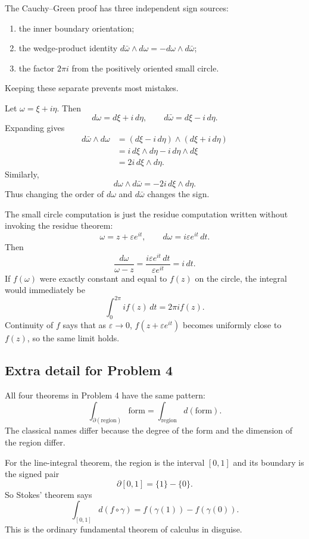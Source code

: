 \documentclass[11pt]{article}
\newcommand{\eps}{\varepsilon}
\begin{document}
The Cauchy--Green proof has three independent sign sources:
\begin{enumerate}
\item the inner boundary orientation;
\item the wedge-product identity $d\bar\omega\wedge d\omega=-d\omega\wedge d\bar\omega$;
\item the factor $2\pi i$ from the positively oriented small circle.
\end{enumerate}
Keeping these separate prevents most mistakes.

Let $\omega=\xi+i\eta$. Then
\[
 d\omega=d\xi+i\,d\eta,\qquad d\bar\omega=d\xi-i\,d\eta.
\]
Expanding gives
\[
\begin{aligned}
 d\bar\omega\wedge d\omega
 &=(d\xi-i\,d\eta)\wedge(d\xi+i\,d\eta)\\
 &=i\,d\xi\wedge d\eta-i\,d\eta\wedge d\xi\\
 &=2i\,d\xi\wedge d\eta.
\end{aligned}
\]
Similarly,
\[
 d\omega\wedge d\bar\omega=-2i\,d\xi\wedge d\eta.
\]
Thus changing the order of $d\omega$ and $d\bar\omega$ changes the sign.

The small circle computation is just the residue computation written without invoking the residue theorem:
\[
 \omega=z+\eps e^{it},\qquad d\omega=i\eps e^{it}\,dt.
\]
Then
\[
 \frac{d\omega}{\omega-z}
 =
 \frac{i\eps e^{it}\,dt}{\eps e^{it}}
 =
 i\,dt.
\]
If $f(\omega)$ were exactly constant and equal to $f(z)$ on the circle, the integral would immediately be
\[
 \int_0^{2\pi} i f(z)\,dt=2\pi i f(z).
\]
Continuity of $f$ says that as $\eps\to0$, $f(z+\eps e^{it})$ becomes uniformly close to $f(z)$, so the same limit holds.

\subsection*{Extra detail for Problem 4}

All four theorems in Problem 4 have the same pattern:
\[
 \int_{\partial(\text{region})}\text{form}
 =
 \int_{\text{region}}d(\text{form}).
\]
The classical names differ because the degree of the form and the dimension of the region differ.

For the line-integral theorem, the region is the interval $[0,1]$ and its boundary is the signed pair
\[
 \partial[0,1]=\{1\}-\{0\}.
\]
So Stokes' theorem says
\[
 \int_{[0,1]}d(f\circ\gamma)
 =
 f(\gamma(1))-f(\gamma(0)).
\]
This is the ordinary fundamental theorem of calculus in disguise.
\end{document}
